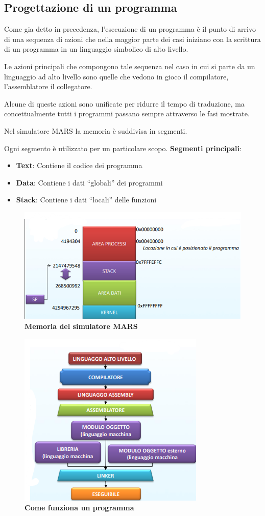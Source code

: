 \documentclass[12pt]{article} %
\begin{document}
\subsection{Progettazione di un programma}
Come gia detto in precedenza, l’esecuzione di un programma è il punto di arrivo di una sequenza di azioni che nella maggior parte dei casi iniziano con la scrittura di un programma in un linguaggio simbolico di alto livello.\par\medskip\noindent
Le azioni principali che compongono tale sequenza nel caso in cui si parte da un linguaggio ad alto livello sono quelle che vedono in gioco il compilatore, l’assemblatore il collegatore.\par\medskip\noindent
Alcune di queste azioni sono unificate per ridurre il tempo di traduzione, ma concettualmente tutti i programmi passano sempre attraverso le fasi mostrate.\par\medskip\noindent
Nel simulatore MARS la memoria è suddivisa in segmenti. \par\medskip\noindent Ogni segmento è utilizzato per un particolare scopo. \textbf{Segmenti principali}:
\begin{itemize}
\item  \textbf{Text}: Contiene il codice dei programma 
\item \textbf{Data}: Contiene i dati “globali” dei programmi
\item \textbf{Stack}: Contiene i dati “locali” delle funzioni
\end{itemize}
\begin{figure}[h]
\centering
\includegraphics[width=0.60\linewidth]{mars.png}
\caption{\textbf{Memoria del simulatore MARS}}
\label{fig:enter-label}
\end{figure}
\begin{figure}[h]
\centering
\includegraphics[width=0.50\linewidth]{introduzione.png}
\caption{\textbf{Come funziona un programma}}
\label{fig:enter-label}
\end{figure}
\newpage
\end{document}
